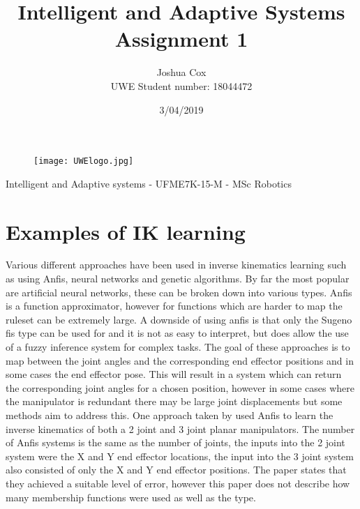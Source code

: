 \documentclass[a4paper,11pt]{article}
\begin{document}
\begin{titlepage}

\begin{figure}[!t]
  \texttt{[image: UWElogo.jpg]}
\end{figure}

\title{Intelligent and Adaptive Systems Assignment 1} 

\author{Joshua Cox \\
UWE Student number: 18044472}
\date{3/04/2019}

\maketitle
\center \large Intelligent and Adaptive systems - UFME7K-15-M - MSc Robotics
\end{titlepage}




\section{Examples of IK learning}
Various different approaches have been used in inverse kinematics learning such as using Anfis, neural networks and genetic algorithms. By far the most popular are artificial neural networks, these can be broken down into various types.
Anfis is a function approximator, however for functions which are harder to map the ruleset can be extremely large. A downside of using anfis is that only the Sugeno fis type can be used for and it is not as easy to interpret, but does allow the use of a fuzzy inference system for complex tasks.
The goal of these approaches is to map between the joint angles and the corresponding end effector positions and in some cases the end effector pose. This will result in a system which can return the corresponding joint angles for a chosen position, however in some cases where the manipulator is redundant there may be large joint displacements but some methods aim to address this.
\newline
\newline
One approach taken by  \cite{anfis1} used Anfis to learn the inverse kinematics of both a 2 joint and 3 joint planar manipulators. The number of Anfis systems is the same as the number of joints, the inputs into the 2 joint system were the X and Y end effector locations, the input into the 3 joint system also consisted of only the X and Y end effector positions. The paper states that they achieved a suitable level of error, however this paper does not describe how many membership functions were used as well as the type. 
\end{document}

